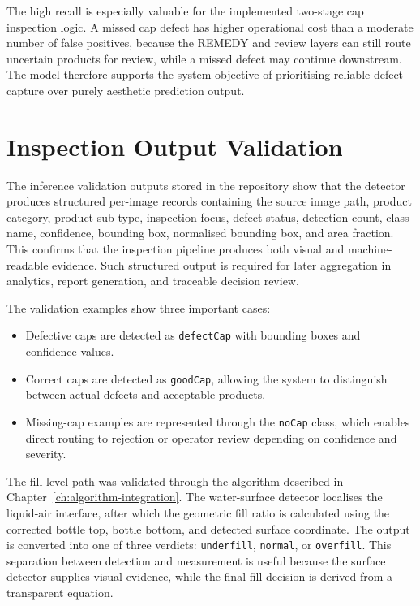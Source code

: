 \documentclass[12pt,a4paper]{report}
\begin{document}
The high recall is especially valuable for the implemented two-stage cap inspection logic. A missed cap defect has higher operational cost than a moderate number of false positives, because the REMEDY and review layers can still route uncertain products for review, while a missed defect may continue downstream. The model therefore supports the system objective of prioritising reliable defect capture over purely aesthetic prediction output.

\section{Inspection Output Validation}
\label{sec:inspection-output-validation}

The inference validation outputs stored in the repository show that the detector produces structured per-image records containing the source image path, product category, product sub-type, inspection focus, defect status, detection count, class name, confidence, bounding box, normalised bounding box, and area fraction. This confirms that the inspection pipeline produces both visual and machine-readable evidence. Such structured output is required for later aggregation in analytics, report generation, and traceable decision review.

The validation examples show three important cases:
\begin{itemize}
  \item Defective caps are detected as \texttt{defectCap} with bounding boxes and confidence values.
  \item Correct caps are detected as \texttt{goodCap}, allowing the system to distinguish between actual defects and acceptable products.
  \item Missing-cap examples are represented through the \texttt{noCap} class, which enables direct routing to rejection or operator review depending on confidence and severity.
\end{itemize}

The fill-level path was validated through the algorithm described in Chapter~\ref{ch:algorithm-integration}. The water-surface detector localises the liquid-air interface, after which the geometric fill ratio is calculated using the corrected bottle top, bottle bottom, and detected surface coordinate. The output is converted into one of three verdicts: \texttt{underfill}, \texttt{normal}, or \texttt{overfill}. This separation between detection and measurement is useful because the surface detector supplies visual evidence, while the final fill decision is derived from a transparent equation.
\end{document}
